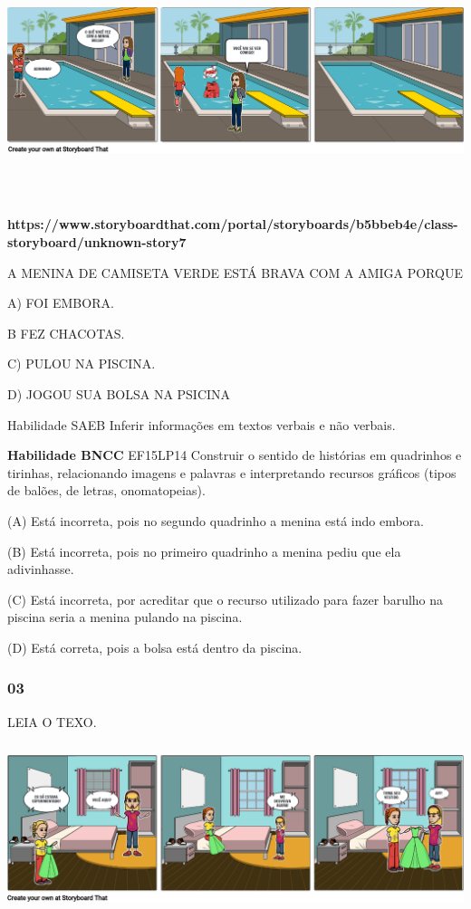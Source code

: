 \includegraphics[width=6.12986in,height=2.72778in]{media/image181.png}

\textbf{https://www.storyboardthat.com/portal/storyboards/b5bbeb4e/class-storyboard/unknown-story7}

A MENINA DE CAMISETA VERDE ESTÁ BRAVA COM A AMIGA PORQUE

A) FOI EMBORA.

B FEZ CHACOTAS.

C) PULOU NA PISCINA.

D) JOGOU SUA BOLSA NA PSICINA

Habilidade SAEB Inferir informações em textos verbais e não verbais.

\textbf{Habilidade BNCC} EF15LP14 Construir o sentido de histórias em
quadrinhos e tirinhas, relacionando imagens e palavras e interpretando
recursos gráficos (tipos de balões, de letras, onomatopeias).

(A) Está incorreta, pois no segundo quadrinho a menina está indo embora.

(B) Está incorreta, pois no primeiro quadrinho a menina pediu que ela
adivinhasse.

(C) Está incorreta, por acreditar que o recurso utilizado para fazer
barulho na piscina seria a menina pulando na piscina.

(D) Está correta, pois a bolsa está dentro da
piscina.\protect\hypertarget{_heading=h.tt4s01xrdwwn}{}{}

\subsubsection{03 }\label{section-25}

LEIA O
TEXO.\includegraphics[width=6.07986in,height=2.24583in]{media/image182.png}

